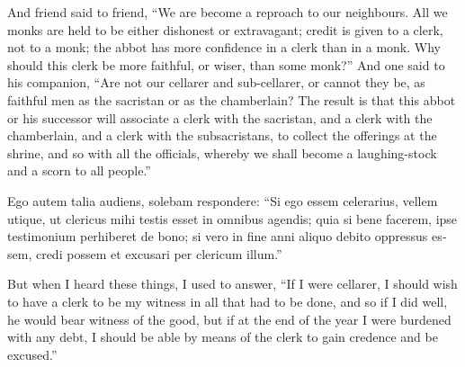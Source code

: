 \documentclass[10pt]{book}
\begin{document}
\begin{paracol}{2}
And friend said to friend, ``We are become a reproach to our neighbours. All we monks are held to be either dishonest or extravagant; credit is given to a clerk, not to a monk; the abbot has more confidence in a clerk than in a monk. Why should this clerk be more faithful, or wiser, than some monk?'' And one said to his companion, ``Are not our cellarer and sub-cellarer, or cannot they be, as faithful men as the sacristan or as the chamberlain? The result is that this abbot or his successor will associate a clerk with the sacristan, and a clerk with the chamberlain, and a clerk with the subsacristans, to collect the offerings at the shrine, and so with all the officials, whereby we shall become a laughing-stock and a scorn to all people.''

\switchcolumn*

\begin{otherlanguage}{latin}
Ego autem talia audiens, solebam respondere: ``Si ego essem celerarius, vellem utique, ut clericus mihi testis esset in omnibus agendis; quia si bene facerem, ipse testimonium perhiberet de bono; si vero in fine anni aliquo debito oppressus essem, credi possem et excusari per clericum illum.''
\end{otherlanguage}

\switchcolumn

But when I heard these things, I used to answer, ``If I were cellarer, I should wish to have a clerk to be my witness in all that had to be done, and so if I did well, he would bear witness of the good, but if at the end of the year I were burdened with any debt, I should be able by means of the clerk to gain credence and be excused.''

\switchcolumn*


\end{paracol}
\end{document}
